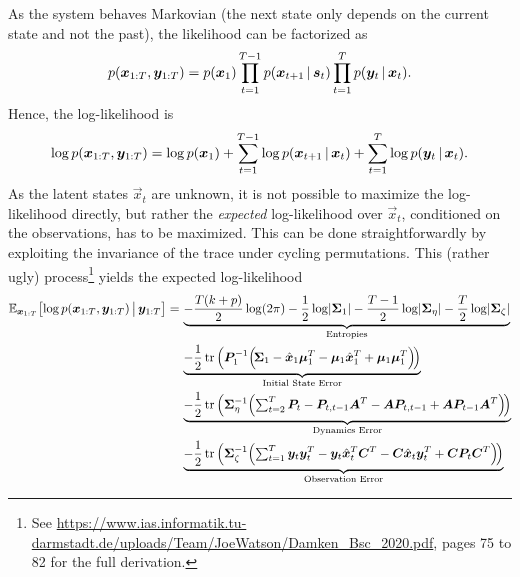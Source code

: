			As the system behaves Markovian (the next state only depends on the current state and not the past), the likelihood can be factorized as
			\begin{equation*}
				p(\bm{x}_{1:T}, \bm{y}_{1:T}) = p(\bm{x}_1) \prod_{t = 1}^{T - 1} p(\bm{x}_{t + 1} \,\vert\, \bm{s}_t) \prod_{t = 1}^{T} p(\bm{y}_t \,\vert\, \bm{x}_t).
			\end{equation*}
			Hence, the log-likelihood is
			\begin{equation*}
				\log p(\bm{x}_{1:T}, \bm{y}_{1:T}) = \log p(\bm{x}_1) + \sum_{t = 1}^{T - 1} \log p(\bm{x}_{t + 1} \,\vert\, \bm{x}_t) + \sum_{t = 1}^{T} \log p(\bm{y}_t \,\vert\, \bm{x}_t).
			\end{equation*}
			As the latent states \(\vec{x}_t\) are unknown, it is not possible to maximize the log-likelihood directly, but rather the \emph{expected} log-likelihood over \(\vec{x}_t\), conditioned on the observations, has to be maximized. This can be done straightforwardly by exploiting the invariance of the trace under cycling permutations. This (rather ugly) process\footnote{See \url{https://www.ias.informatik.tu-darmstadt.de/uploads/Team/JoeWatson/Damken_Bsc_2020.pdf}, pages 75 to 82 for the full derivation.} yields the expected log-likelihood
			\begin{align*}
				\mathbb{E}_{\bm{x}_{1:T}}\big[\! \log p(\bm{x}_{1:T}, \bm{y}_{1:T}) \,\big\vert\, \bm{y}_{1:T} \big] =\,
					& \underbrace{-\frac{T (k + p)}{2} \log(2\pi) - \frac{1}{2} \log \lvert \bm{\Sigma}_1 \rvert - \frac{T - 1}{2} \log \lvert \bm{\Sigma}_\eta \rvert - \frac{T}{2} \log \lvert \bm{\Sigma}_\zeta \rvert}_\text{Entropies} \\
					& \underbrace{-\frac{1}{2} \tr\Big( \bm{P}_1^{-1} \Big(\! \bm{\Sigma}_1 - \hat{\bm{x}}_1 \bm{\mu}_1^T - \bm{\mu}_1 \hat{\bm{x}}_1^T + \bm{\mu}_1 \bm{\mu}_1^T \Big) \!\Big)}_\text{Initial State Error} \\
					& \underbrace{-\frac{1}{2} \tr\Big( \bm{\Sigma}_\eta^{-1} \Big(\! \textstyle\sum_{t = 2}^{T}\displaystyle \bm{P}_t - \bm{P}_{t, t - 1} \bm{A}^T - \bm{A} \bm{P}_{t, t - 1} + \bm{A} \bm{P}_{t - 1} \bm{A}^T \Big) \!\Big)}_\text{Dynamics Error} \\
					& \underbrace{-\frac{1}{2} \tr\Big( \bm{\Sigma}_\zeta^{-1} \Big(\! \textstyle\sum_{t = 1}^{T}\displaystyle \bm{y}_t \bm{y}_t^T - \bm{y}_t \hat{\bm{x}}_t^T \bm{C}^T - \bm{C} \hat{\bm{x}}_t \bm{y}_t^T + \bm{C} \bm{P}_t \bm{C}^T \Big) \!\Big)}_\text{Observation Error}
			\end{align*}
